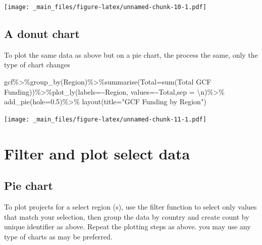 \documentclass[
]{book}
\newenvironment{Shaded}{\begin{snugshade}}{\end{snugshade}}
\newcommand{\AttributeTok}[1]{\textcolor[rgb]{0.77,0.63,0.00}{#1}}
\newcommand{\FloatTok}[1]{\textcolor[rgb]{0.00,0.00,0.81}{#1}}
\newcommand{\FunctionTok}[1]{\textcolor[rgb]{0.00,0.00,0.00}{#1}}
\newcommand{\NormalTok}[1]{#1}
\newcommand{\OtherTok}[1]{\textcolor[rgb]{0.56,0.35,0.01}{#1}}
\newcommand{\SpecialCharTok}[1]{\textcolor[rgb]{0.00,0.00,0.00}{#1}}
\newcommand{\StringTok}[1]{\textcolor[rgb]{0.31,0.60,0.02}{#1}}
\begin{document}
\texttt{[image: \_main\_files/figure-latex/unnamed-chunk-10-1.pdf]}

\hypertarget{a-donut-chart}{%
\subsection{A donut chart}\label{a-donut-chart}}

To plot the same data as above but on a pie chart, the process the same, only the type of chart changes

\begin{Shaded}
\begin{Highlighting}[]
\NormalTok{gcf}\SpecialCharTok{\%\textgreater{}\%}\FunctionTok{group\_by}\NormalTok{(Region)}\SpecialCharTok{\%\textgreater{}\%}\FunctionTok{summarise}\NormalTok{(}\StringTok{\textquotesingle{}Total\textquotesingle{}}\OtherTok{=}\FunctionTok{sum}\NormalTok{(}\StringTok{\textasciigrave{}}\AttributeTok{Total GCF Funding}\StringTok{\textasciigrave{}}\NormalTok{))}\SpecialCharTok{\%\textgreater{}\%}\FunctionTok{plot\_ly}\NormalTok{(}\AttributeTok{labels=}\SpecialCharTok{\textasciitilde{}}\NormalTok{Region, }\AttributeTok{values=}\SpecialCharTok{\textasciitilde{}}\NormalTok{Total,}\AttributeTok{sep =} \StringTok{\textquotesingle{}}\SpecialCharTok{\textbackslash{}n}\StringTok{\textquotesingle{}}\NormalTok{)}\SpecialCharTok{\%\textgreater{}\%} \FunctionTok{add\_pie}\NormalTok{(}\AttributeTok{hole=}\FloatTok{0.5}\NormalTok{)}\SpecialCharTok{\%\textgreater{}\%}
    \FunctionTok{layout}\NormalTok{(}\AttributeTok{title=}\StringTok{"GCF Funding by Region"}\NormalTok{)}
\end{Highlighting}
\end{Shaded}

\texttt{[image: \_main\_files/figure-latex/unnamed-chunk-11-1.pdf]}

\hypertarget{filter-and-plot-select-data}{%
\section{Filter and plot select data}\label{filter-and-plot-select-data}}

\hypertarget{pie-chart}{%
\subsection{Pie chart}\label{pie-chart}}

To plot projects for a select region (s), use the filter function to select only values that match your selection, then group the data by country and create count by unique identifier as above. Repeat the plotting steps as above. you may use any type of charts as may be preferred.
\end{document}
